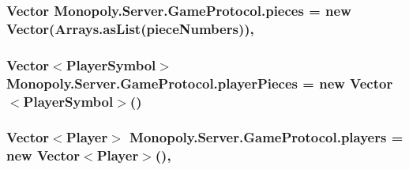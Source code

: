 \subsubsection[{\texorpdfstring{pieces}{pieces}}]{\setlength{\rightskip}{0pt plus 5cm}Vector Monopoly.\+Server.\+Game\+Protocol.\+pieces = new Vector(Arrays.\+as\+List({\bf piece\+Numbers}))\hspace{0.3cm}{\ttfamily [static]}, {\ttfamily [private]}}\hypertarget{class_monopoly_1_1_server_1_1_game_protocol_acb6614eed8c28cabb459d7b7c914e84d}{}\label{class_monopoly_1_1_server_1_1_game_protocol_acb6614eed8c28cabb459d7b7c914e84d}
\subsubsection[{\texorpdfstring{player\+Pieces}{playerPieces}}]{\setlength{\rightskip}{0pt plus 5cm}Vector$<${\bf Player\+Symbol}$>$ Monopoly.\+Server.\+Game\+Protocol.\+player\+Pieces = new Vector$<${\bf Player\+Symbol}$>$()\hspace{0.3cm}{\ttfamily [private]}}\hypertarget{class_monopoly_1_1_server_1_1_game_protocol_a8fb151d3b8550a9d379c21159eae6585}{}\label{class_monopoly_1_1_server_1_1_game_protocol_a8fb151d3b8550a9d379c21159eae6585}
\subsubsection[{\texorpdfstring{players}{players}}]{\setlength{\rightskip}{0pt plus 5cm}Vector$<${\bf Player}$>$ Monopoly.\+Server.\+Game\+Protocol.\+players = new Vector$<${\bf Player}$>$()\hspace{0.3cm}{\ttfamily [static]}, {\ttfamily [private]}}\hypertarget{class_monopoly_1_1_server_1_1_game_protocol_ab7cff2b620c79623d1787e36ec5850f0}{}\label{class_monopoly_1_1_server_1_1_game_protocol_ab7cff2b620c79623d1787e36ec5850f0}
